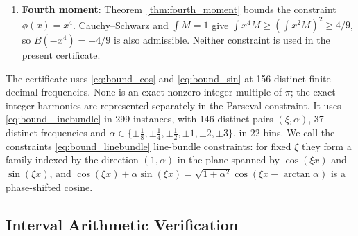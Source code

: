 \documentclass[11pt,a4paper]{article}
\theoremstyle{definition}
\theoremstyle{remark}
\begin{document}
\begin{enumerate}
\begin{proof}
  As derived in Section~\ref{sec:continuous}, $\int_{-2}^2 \cos(\xi x) M_f(x) \, dx = 2su - u^2 - v^2$ and $\int_{-2}^2 \sin(\xi x) M_f(x) \, dx = 2sv$.
  For \eqref{eq:bound_cos}: $2su - u^2 - v^2 = s^2 - (u - s)^2 - v^2 \le s^2$. Averaging the two disk inequalities gives $(u-s)^2+v^2 \le 1-s^2$. Hence $u^2+v^2-2su \le 1-2s^2$, proving \eqref{eq:bound_negcos}; equality holds on the lens at $u=s$, $v^2=1-s^2$. The same averaged inequality gives $v^2 \le 1-s^2$. For \eqref{eq:bound_sin}: $|2sv| = 2|s||v| \le 2|s|\sqrt{1 - s^2}$. For \eqref{eq:bound_linebundle}: $\operatorname{Re}\widehat{M} - \alpha \operatorname{Im}\widehat{M} = 2su - u^2 - v^2 + 2\alpha sv = (1 + \alpha^2)s^2 - (u - s)^2 - (v - \alpha s)^2 \le (1 + \alpha^2)s^2$.
  \end{proof}
\item \textbf{Fourth moment}:
  Theorem~\ref{thm:fourth_moment} bounds the constraint $\phi(x)=x^4$. Cauchy--Schwarz and $\int M=1$ give $\int x^4M \ge (\int x^2M)^2 \ge 4/9$, so $B(-x^4)=-4/9$ is also admissible. Neither constraint is used in the present certificate.
\end{enumerate}

The certificate uses \eqref{eq:bound_cos} and \eqref{eq:bound_sin} at 156 distinct finite-decimal frequencies. None is an exact nonzero integer multiple of $\pi$; the exact integer harmonics are represented separately in the Parseval constraint. It uses \eqref{eq:bound_linebundle} in 299 instances, with 146 distinct pairs $(\xi, \alpha)$, 37 distinct frequencies and $\alpha \in \{\pm\frac{1}{8}, \pm\frac{1}{4}, \pm\frac{1}{2}, \pm 1, \pm 2, \pm 3\}$, in 22 bins. We call the constraints \eqref{eq:bound_linebundle} line-bundle constraints: for fixed $\xi$ they form a family indexed by the direction $(1, \alpha)$ in the plane spanned by $\cos(\xi x)$ and $\sin(\xi x)$, and $\cos(\xi x) + \alpha \sin(\xi x) = \sqrt{1 + \alpha^2} \cos(\xi x - \arctan \alpha)$ is a phase-shifted cosine.

\subsection{Interval Arithmetic Verification}
\end{document}
